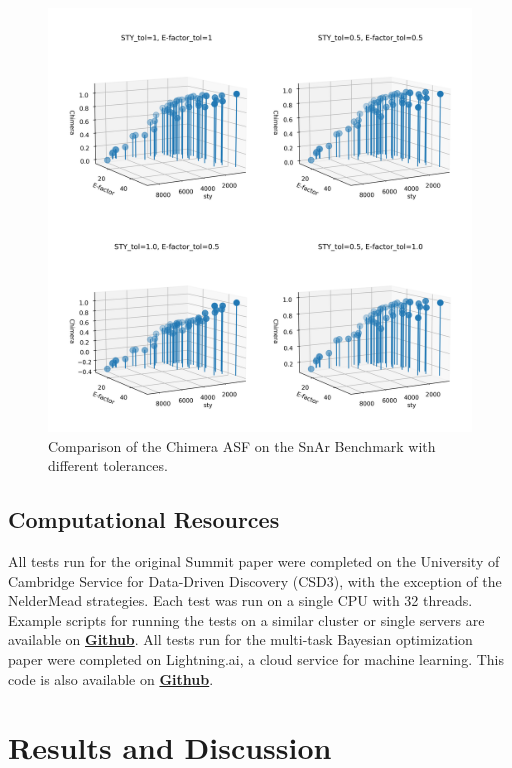 \begin{figure}
    \includegraphics[width=\textwidth]{gfx/Chapter02/chimera_comparison.png}
    \caption{Comparison of the Chimera ASF on the SnAr Benchmark with different tolerances.}
    \label{fig:chimera_comparsion}
\end{figure}

\subsection{Computational Resources}
 All tests run for the original Summit paper were completed on the University of Cambridge Service for Data-Driven Discovery (CSD3), with the exception of the NelderMead strategies. Each test was run on a single CPU with 32 threads. Example scripts for running the tests on a similar cluster or single servers are available on \textbf{\href{https://github.com/sustainable-processes/summit/tree/master/experiments}{Github}}. All tests run for the multi-task Bayesian optimization paper were completed on Lightning.ai, a cloud service for machine learning. This code is also available on \textbf{\href{https://github.com/sustainable-processes/multitask}{Github}}.


\section{Results and Discussion}

